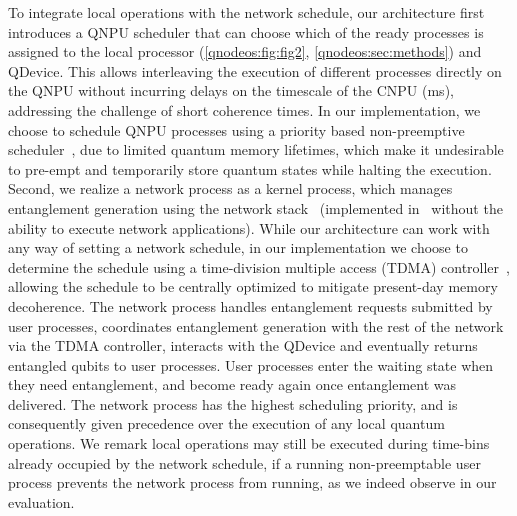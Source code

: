 To integrate local operations with the network schedule, our architecture first introduces a QNPU scheduler that can choose which of the ready processes is assigned to the local processor (\cref{qnodeos:fig:fig2}, \cref{qnodeos:sec:methods}) and QDevice.
This allows interleaving the execution of different processes directly on the QNPU without incurring delays on the timescale of the CNPU (ms), addressing the challenge of short coherence times.
In our implementation, we choose to schedule QNPU processes using a priority based non-preemptive scheduler~\cite{liu_1973_scheduling}, due to limited quantum memory lifetimes, which make it undesirable to pre-empt and temporarily store quantum states while halting the execution.
Second, we realize a network process as a kernel process, which manages entanglement generation using the network stack~\cite{dahlberg_2019_egp,kozlowski_2020_qnp} (implemented in~\cite{pompili_2022_experimental} without the ability to execute network applications).
While our architecture can work with any way of setting a network schedule, in our implementation we choose to determine the schedule using a time-division multiple access (TDMA) controller~\cite{skrzypczyk_2021_arch}, allowing the schedule to be centrally optimized to mitigate present-day memory decoherence.
The network process handles entanglement requests submitted by user processes, coordinates entanglement generation with the rest of the network via the TDMA controller, interacts with the QDevice and eventually returns entangled qubits to user processes.
User processes enter the waiting state when they need entanglement, and become ready again once entanglement was delivered.
The network process has the highest scheduling priority, and is consequently given precedence over the execution of any local quantum operations.
We remark local operations may still be executed during time-bins already occupied by the network schedule, if a running non-preemptable user process prevents the network process from running, as we indeed observe in our evaluation.

